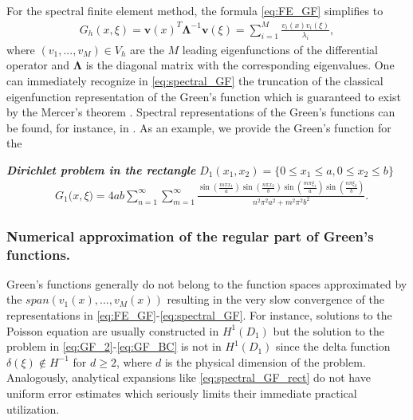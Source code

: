 For the spectral finite element method, the formula \eqref{eq:FE_GF} simplifies to
\begin{align} \label{eq:spectral_GF}
	G_h(x,\xi) = \mathbf{v}(x)^T \mathbf\Lambda^{-1} \mathbf{v}(\xi) = \sum_{i=1}^M \frac{ v_i(x) v_i(\xi) }{\lambda_i},
\end{align}
where $(v_1,...,v_M) \in V_h$ are the $M$ leading eigenfunctions of the differential operator and $\mathbf\Lambda$ is the diagonal matrix with the corresponding eigenvalues.
One can immediately recognize in \eqref{eq:spectral_GF} the truncation of the classical eigenfunction representation of the Green's function which is guaranteed to exist by the Mercer's theorem \cite{Fasshauer2016}.
Spectral representations of the Green's functions can be found, for instance, in \cite{Duffy2001}.
As an example, we provide the Green's function for the 

\textit{\textbf{Dirichlet problem in the rectangle}} $D_1(x_1,x_2)=\{0 \leq x_1 \leq a, 0 \leq x_2 \leq b \}$
\begin{align} \label{eq:spectral_GF_rect}
	&G_1 \big( x, \xi \big) = 
	4ab \sum_{n=1}^{\infty} \sum_{m=1}^{\infty} \frac{ \displaystyle{ \sin \left( \frac{m\pi x_1 }{a} \right) \sin \left( \frac{n\pi x_2 }{b} \right) \sin \left( \frac{m\pi \xi_1 }{a} \right) \sin \left( \frac{n\pi \xi_2 }{b} \right)  } }{ n^2 \pi^2 a^2 + m^2 \pi^2 b^2 }.
\end{align}


\subsubsection{Numerical approximation of the regular part of Green's functions.}

Green's functions generally do not belong to the function spaces approximated by the $span(v_1(x),...,v_M(x))$ resulting in the very slow convergence of the representations in \eqref{eq:FE_GF}-\eqref{eq:spectral_GF}.
For instance, solutions to the Poisson equation are usually constructed in $H^1(D_1)$ but the solution to the problem in \eqref{eq:GF_2}-\eqref{eq:GF_BC} is not in $H^1(D_1)$ since the delta function $\delta(\xi) \notin H^{-1}$ for $d\geq2$, where $d$ is the physical dimension of the problem.
Analogously, analytical expansions like \eqref{eq:spectral_GF_rect} do not have uniform error estimates which seriously limits their immediate practical utilization.

